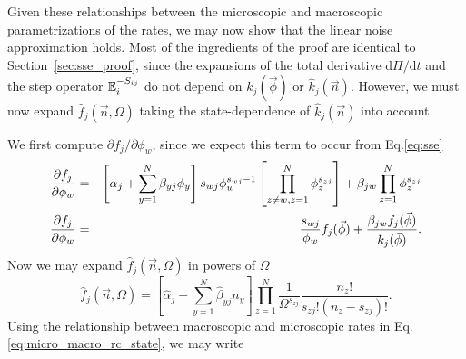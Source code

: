 \documentclass[10pt,letterpaper]{article}
\begin{document}
Given these relationships between the microscopic and macroscopic parametrizations of the rates, we may now show that the linear noise approximation holds. Most of the ingredients of the proof are identical to Section~\ref{sec:sse_proof}, since the expansions of the total derivative $\text{d}\Pi/\text{d}t$ and the step operator $\mathbb{E}_i^{-S_{ij}}$ do not depend on $k_j(\vec{\phi})$ or $\hat{k}_j(\vec{n})$. However, we must now expand $\hat{f}_j(\vec{n},\Omega)$ taking the state-dependence of $\hat{k}_j(\vec{n})$ into account. 

We first compute $\partial f_j/ \partial \phi_w$, since we expect this term to occur from Eq.\eqref{eq:sse}  
\begin{eqnarray}
\frac{\partial f_j}{\partial\phi_w} &=& \left[ \alpha_j + \sum_{y=1}^N \beta_{yj} \phi_y \right] s_{wj}\phi_w^{s_{wj} - 1} \left[\prod_{z \neq w, z = 1}^N\phi_z^{s_{zj}}\right] + \beta_{jw}\prod_{z = 1}^N\phi_z^{s_{zj}}\nonumber \\
\frac{\partial f_j}{\partial\phi_w} &=& \frac{s_{wj}}{\phi_w}f_j(\vec{\phi}) + \frac{\beta_{jw} f_j(\vec{\phi})}{k_j(\vec{\phi})}. \label{eq:deriv_macro_rfn_state}
\end{eqnarray}
Now we may expand $\hat{f}_j(\vec{n},\Omega)$ in powers of $\Omega$
\begin{equation}
\hat{f}_j(\vec{n},\Omega) = \left[ \hat{\alpha}_j + \sum_{y=1}^N \hat{\beta}_{yj} n_y \right] \prod_{z=1}^N \frac{1}{\Omega^{s_{zj}}} \frac{n_z!}{s_{zj}!(n_z-s_{zj})!}. 
\end{equation}
Using the relationship between macroscopic and microscopic rates in Eq.\eqref{eq:micro_macro_rc_state}, we may write
\end{document}
